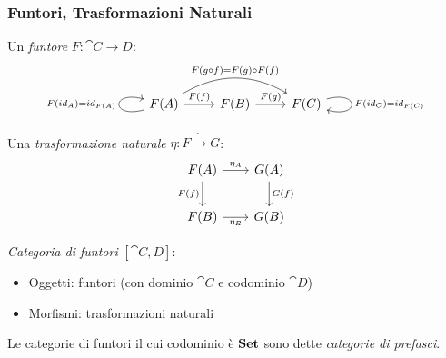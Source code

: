 \documentclass[8pt]{beamer}
\begin{document}
\begin{frame}[fragile]\frametitle{Funtori, Trasformazioni Naturali}
	Un \emph{funtore} $F: \cat{C \to D}$:
        \[\begin{tikzcd} F(A) \arrow[loop left, "{F(id_A) = id_{F(A)}}"] \arrow[r, "F(f)"] 
        \arrow[rr, bend left=30, "{F(g \circ f) = F(g) \circ F(f)}"] & F(B) \arrow[r, "F(g)"] & F(C) 
        \arrow[loop right, "{F(id_C) = id_{F(C)}}"] \end{tikzcd}\]

        Una \emph{trasformazione naturale} $\eta:F \dot\to G$: %
    \[
        \begin{tikzcd}[row sep = 20, column sep = 20]
            F(A) \arrow[d, "F(f)" swap] \arrow[r, "{\eta_A}"] & G(A) \arrow[d, "G(f)"] \\
            F(B) \arrow[r, "{\eta_B}"swap] & G(B)
        \end{tikzcd}
    \]

    \emph{Categoria di funtori} $[\cat{C, D}]$:
    \begin{itemize}
	    \item Oggetti: funtori (con dominio $\cat C$ e codominio $\cat D$)
	    \item Morfismi: trasformazioni naturali
	\end{itemize}
        \smallskip

    Le categorie di funtori il cui codominio è $\mathbf{Set}$ sono dette \emph{categorie di prefasci}.
\end{frame}
\end{document}
